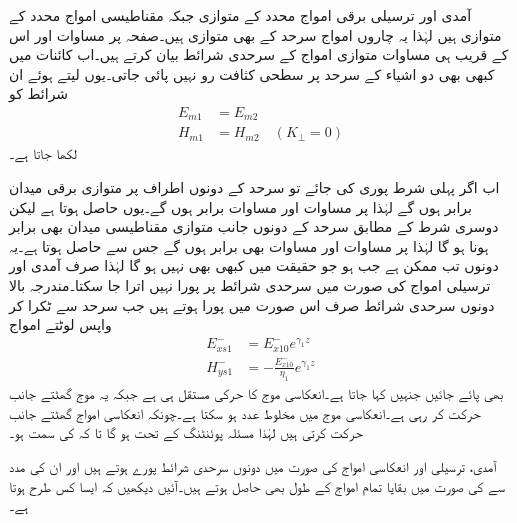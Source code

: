 آمدی اور ترسیلی برقی امواج  محدد کے متوازی جبکہ مقناطیسی امواج  محدد کے متوازی ہیں لہٰذا یہ چاروں امواج سرحد کے بھی متوازی ہیں۔صفحہ  پر مساوات  اور اس کے قریب ہی مساوات  متوازی امواج کے سرحدی شرائط بیان کرتے ہیں۔اب کائنات میں کبھی بھی دو اشیاء کے سرحد پر سطحی کثافت رو نہیں پائی جاتی۔یوں  لیتے ہوئے ان شرائط کو
\begin{align*}
E_{m1}&=E_{m2}\\
H_{m1}&=H_{m2} \quad(K_\perp=0)
\end{align*}
لکھا جاتا ہے۔

اب اگر پہلی شرط پوری کی جائے تو سرحد کے دونوں اطراف پر متوازی برقی میدان برابر ہوں گے  لہٰذا  پر مساوات  اور مساوات  برابر ہوں گے۔یوں  حاصل ہوتا ہے لیکن دوسری شرط کے مطابق سرحد کے دونوں جانب متوازی مقناطیسی میدان بھی برابر ہونا ہو گا لہٰذا  پر مساوات  اور مساوات  بھی برابر ہوں گے جس سے  حاصل ہوتا ہے۔یہ دونوں تب ممکن ہے جب  ہو جو حقیقت میں کبھی بھی نہیں ہو گا لہٰذا صرف آمدی اور ترسیلی امواج کی صورت میں سرحدی شرائط پر پورا نہیں اترا جا سکتا۔مندرجہ بالا دونوں سرحدی شرائط صرف اس صورت میں پورا ہوتے ہیں جب سرحد سے ٹکرا کر واپس لوٹتے امواج
\begin{align}
E_{xs1}^-&=E_{x10}^-e^{\gamma_1 z}\\
H_{ys1}^-&=-\frac{E_{x10}^-}{\eta_1} e^{\gamma_1 z}
\end{align}
 بھی پائے جائیں جنہیں  کہا جاتا ہے۔انعکاسی موج کا  حرکی مستقل  ہی ہے جبکہ یہ موج  گھٹتے  جانب حرکت کر رہی ہے۔انعکاسی موج میں  مخلوط عدد ہو سکتا ہے۔چونکہ انعکاسی امواج گھٹتے  جانب حرکت کرتی ہیں لہٰذا مسئلہ پوئنٹنگ کے تحت  ہو گا تا کہ  کی سمت  ہو۔

آمدی، ترسیلی اور انعکاسی امواج کی صورت میں دونوں سرحدی شرائط پورے ہوتے ہیں اور ان کی مدد سے  کی صورت میں بقایا تمام امواج کے طول بھی حاصل ہوتے ہیں۔آئیں دیکھیں کہ ایسا کس طرح ہوتا ہے۔

